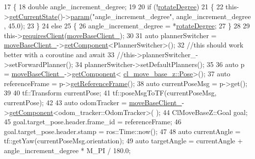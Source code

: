 \begin{DoxyCode}
17 \{
18     \textcolor{keywordtype}{double} angle\_increment\_degree;
19 
20     \textcolor{keywordflow}{if} (!\hyperlink{classcl__move__base__z_1_1CbRotate_a83e9f97e917044f919c98a55d8e00db6}{rotateDegree})
21     \{
22         this->\hyperlink{classsmacc_1_1SmaccClientBehavior_abf6773e4dd948f932f11a346dd6e7c2c}{getCurrentState}()->\hyperlink{classsmacc_1_1ISmaccState_a4982f2187ed6da337462721146e8ef70}{param}(\textcolor{stringliteral}{"angle\_increment\_degree"}, angle\_increment\_degree
      , 45.0);
23     \}
24     \textcolor{keywordflow}{else}
25     \{
26         angle\_increment\_degree = *\hyperlink{classcl__move__base__z_1_1CbRotate_a83e9f97e917044f919c98a55d8e00db6}{rotateDegree};
27     \}
28 
29     this->\hyperlink{classsmacc_1_1SmaccClientBehavior_a917f001e763a1059af337bf4e164f542}{requiresClient}(\hyperlink{classcl__move__base__z_1_1CbRotate_a390623f5bcbdad18fe2a65428e4621cb}{moveBaseClient\_});
30 
31     \textcolor{keyword}{auto} plannerSwitcher = \hyperlink{classcl__move__base__z_1_1CbRotate_a390623f5bcbdad18fe2a65428e4621cb}{moveBaseClient\_}->\hyperlink{classsmacc_1_1ISmaccClient_adef78db601749ca63c19e74a27cb88cc}{getComponent}<PlannerSwitcher>();
32     \textcolor{comment}{//this should work better with a coroutine and await}
33     \textcolor{comment}{//this->plannerSwitcher\_->setForwardPlanner();}
34     plannerSwitcher->setDefaultPlanners();
35 
36     \textcolor{keyword}{auto} p = \hyperlink{classcl__move__base__z_1_1CbRotate_a390623f5bcbdad18fe2a65428e4621cb}{moveBaseClient\_}->\hyperlink{classsmacc_1_1ISmaccClient_adef78db601749ca63c19e74a27cb88cc}{getComponent}<
      \hyperlink{classcl__move__base__z_1_1Pose}{cl\_move\_base\_z::Pose}>();
37     \textcolor{keyword}{auto} referenceFrame = p->\hyperlink{classcl__move__base__z_1_1Pose_aaef18a35d7698fcbf6712149eead8e8d}{getReferenceFrame}();
38     \textcolor{keyword}{auto} currentPoseMsg = p->get();
39 
40     tf::Transform currentPose;
41     tf::poseMsgToTF(currentPoseMsg, currentPose);
42 
43     \textcolor{keyword}{auto} odomTracker = \hyperlink{classcl__move__base__z_1_1CbRotate_a390623f5bcbdad18fe2a65428e4621cb}{moveBaseClient\_}->\hyperlink{classsmacc_1_1ISmaccClient_adef78db601749ca63c19e74a27cb88cc}{getComponent}<odom\_tracker::OdomTracker>(
      );
44     ClMoveBaseZ::Goal goal;
45     goal.target\_pose.header.frame\_id = referenceFrame;
46     goal.target\_pose.header.stamp = ros::Time::now();
47 
48     \textcolor{keyword}{auto} currentAngle = tf::getYaw(currentPoseMsg.orientation);
49     \textcolor{keyword}{auto} targetAngle = currentAngle + angle\_increment\_degree * M\_PI / 180.0;

\end{DoxyCode}
